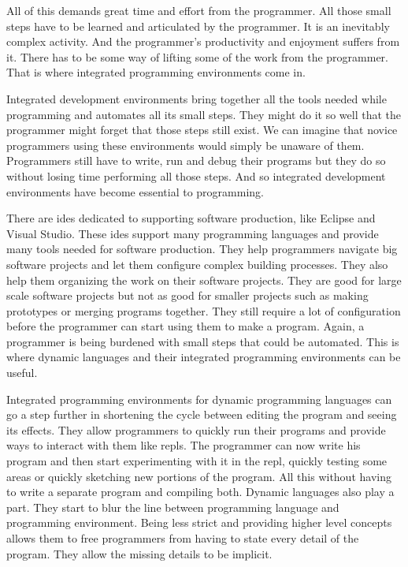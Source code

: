 \documentclass{./llncs2e/llncs}
\begin{document}
	All of this demands great time and effort from the programmer.
	All those small steps have to be learned and articulated by the programmer.
	It is an inevitably complex activity.
	And the programmer's productivity and enjoyment suffers from it.
	There has to be some way of lifting some of the work from the programmer.
	That is where integrated programming environments come in.

	Integrated development environments bring together all the tools needed while programming and automates all its small steps.
	They might do it so well that the programmer might forget that those steps still exist.
	We can imagine that novice programmers using these environments would simply be unaware of them.
	Programmers still have to write, run and debug their programs but they do so without losing time performing all those steps.
	And so integrated development environments have become essential to programming.
	
	There are \ac{ide}s dedicated to supporting software production, like Eclipse and Visual Studio.
	These \ac{ide}s support many programming languages and provide many tools needed for software production.
	They help programmers navigate big software projects and let them configure complex building processes.
	They also help them organizing the work on their software projects.
	They are good for large scale software projects but not as good for smaller projects such as making prototypes or merging programs together.
	They still require a lot of configuration before the programmer can start using them to make a program.
	Again, a programmer is being burdened with small steps that could be automated.
	This is where dynamic languages and their integrated programming environments can be useful.

	Integrated programming environments for dynamic programming languages can go a step further in shortening the cycle between editing the program and seeing its effects.
	They allow programmers to quickly run their programs and provide ways to interact with them like \ac{repl}s.
	The programmer can now write his program and then start experimenting with it in the \ac{repl}, quickly testing some areas or quickly sketching new portions of the program.
	All this without having to write a separate program and compiling both.
	Dynamic languages also play a part.
	They start to blur the line between programming language and programming environment.
	Being less strict and providing higher level concepts allows them to free programmers from having to state every detail of the program.
	They allow the missing details to be implicit.
\end{document}
